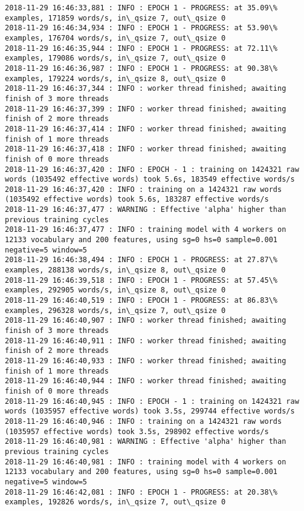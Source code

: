 \documentclass[11pt]{article}
\begin{document}
\begin{Verbatim}[commandchars=\\\{\}]
2018-11-29 16:46:33,881 : INFO : EPOCH 1 - PROGRESS: at 35.09\% examples, 171859 words/s, in\_qsize 7, out\_qsize 0
2018-11-29 16:46:34,934 : INFO : EPOCH 1 - PROGRESS: at 53.90\% examples, 176704 words/s, in\_qsize 7, out\_qsize 0
2018-11-29 16:46:35,944 : INFO : EPOCH 1 - PROGRESS: at 72.11\% examples, 179086 words/s, in\_qsize 7, out\_qsize 0
2018-11-29 16:46:36,987 : INFO : EPOCH 1 - PROGRESS: at 90.38\% examples, 179224 words/s, in\_qsize 8, out\_qsize 0
2018-11-29 16:46:37,344 : INFO : worker thread finished; awaiting finish of 3 more threads
2018-11-29 16:46:37,399 : INFO : worker thread finished; awaiting finish of 2 more threads
2018-11-29 16:46:37,414 : INFO : worker thread finished; awaiting finish of 1 more threads
2018-11-29 16:46:37,418 : INFO : worker thread finished; awaiting finish of 0 more threads
2018-11-29 16:46:37,420 : INFO : EPOCH - 1 : training on 1424321 raw words (1035492 effective words) took 5.6s, 183549 effective words/s
2018-11-29 16:46:37,420 : INFO : training on a 1424321 raw words (1035492 effective words) took 5.6s, 183287 effective words/s
2018-11-29 16:46:37,477 : WARNING : Effective 'alpha' higher than previous training cycles
2018-11-29 16:46:37,477 : INFO : training model with 4 workers on 12133 vocabulary and 200 features, using sg=0 hs=0 sample=0.001 negative=5 window=5
2018-11-29 16:46:38,494 : INFO : EPOCH 1 - PROGRESS: at 27.87\% examples, 288138 words/s, in\_qsize 8, out\_qsize 0
2018-11-29 16:46:39,518 : INFO : EPOCH 1 - PROGRESS: at 57.45\% examples, 292905 words/s, in\_qsize 8, out\_qsize 0
2018-11-29 16:46:40,519 : INFO : EPOCH 1 - PROGRESS: at 86.83\% examples, 296328 words/s, in\_qsize 7, out\_qsize 0
2018-11-29 16:46:40,907 : INFO : worker thread finished; awaiting finish of 3 more threads
2018-11-29 16:46:40,911 : INFO : worker thread finished; awaiting finish of 2 more threads
2018-11-29 16:46:40,933 : INFO : worker thread finished; awaiting finish of 1 more threads
2018-11-29 16:46:40,944 : INFO : worker thread finished; awaiting finish of 0 more threads
2018-11-29 16:46:40,945 : INFO : EPOCH - 1 : training on 1424321 raw words (1035957 effective words) took 3.5s, 299744 effective words/s
2018-11-29 16:46:40,946 : INFO : training on a 1424321 raw words (1035957 effective words) took 3.5s, 298902 effective words/s
2018-11-29 16:46:40,981 : WARNING : Effective 'alpha' higher than previous training cycles
2018-11-29 16:46:40,981 : INFO : training model with 4 workers on 12133 vocabulary and 200 features, using sg=0 hs=0 sample=0.001 negative=5 window=5
2018-11-29 16:46:42,081 : INFO : EPOCH 1 - PROGRESS: at 20.38\% examples, 192826 words/s, in\_qsize 7, out\_qsize 0

\end{Verbatim}
\end{document}
